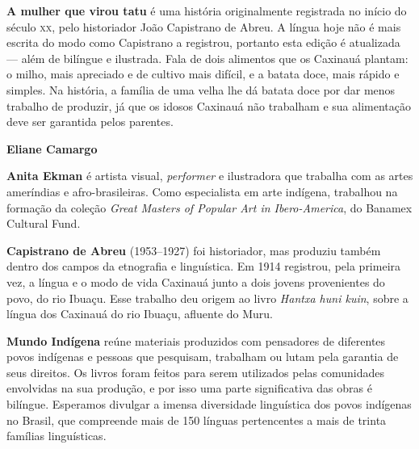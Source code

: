 \textbf{A mulher que virou tatu} é uma história originalmente registrada no início do século \textsc{xx}, pelo historiador João Capistrano de Abreu. A língua hoje não é mais escrita do modo como Capistrano a registrou, portanto esta edição é atualizada --- além de bilíngue e ilustrada. Fala de dois alimentos que os Caxinauá plantam: o milho, mais apreciado e de cultivo mais difícil, e a batata doce, mais rápido e simples. Na história, a família de uma velha lhe dá batata doce por dar menos trabalho de produzir, já que os idosos Caxinauá não trabalham e sua alimentação deve ser garantida pelos parentes.

\textbf{Eliane Camargo} \lipsum[2]

\textbf{Anita Ekman} é artista visual, \textit{performer} e ilustradora que trabalha com as artes ameríndias e afro-brasileiras. Como especialista em arte indígena, trabalhou na formação da coleção \textit{Great Masters of Popular Art in Ibero-America}, do Banamex Cultural Fund.

\textbf{Capistrano de Abreu} (1953--1927) foi historiador, mas produziu também dentro dos campos da etnografia e linguística. Em 1914 registrou, pela primeira vez, a língua e o modo de vida Caxinauá junto a dois jovens provenientes do povo, do rio Ibuaçu. Esse trabalho deu origem ao livro \textit{Hantxa huni kuin}, sobre a língua dos Caxinauá do rio Ibuaçu, afluente do Muru.

\textbf{Mundo Indígena} reúne materiais produzidos com pensadores de diferentes povos indígenas e pessoas que pesquisam, trabalham ou lutam pela garantia de seus direitos. Os livros foram feitos para serem utilizados pelas comunidades envolvidas na sua produção, e por isso uma parte significativa das obras é bilíngue. Esperamos divulgar a imensa diversidade linguística dos povos indígenas no Brasil, que compreende mais de 150 línguas pertencentes a mais de trinta famílias linguísticas.



